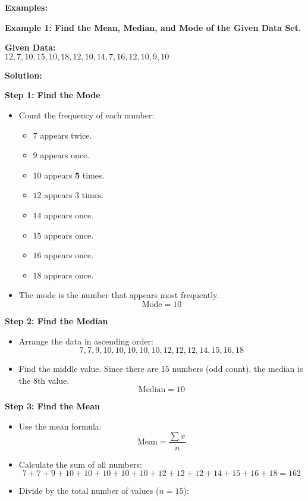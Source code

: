 \textbf{Examples:}

\begin{flushleft}
	\textbf{Example 1: Find the Mean, Median, and Mode of the Given Data Set.}
	
	\textbf{Given Data:} \\ 
	$12, 7, 10, 15, 10, 18, 12, 10, 14, 7, 16, 12, 10, 9, 10$
	
	\vspace{0.5cm}
	\textbf{Solution:}
	
	\textbf{Step 1: Find the Mode}
	\begin{itemize}
		\item Count the frequency of each number:
		\begin{itemize}
			\item $7$ appears twice.
			\item $9$ appears once.
			\item $10$ appears \textbf{5} times.
			\item $12$ appears 3 times.
			\item $14$ appears once.
			\item $15$ appears once.
			\item $16$ appears once.
			\item $18$ appears once.
		\end{itemize}
		\item The mode is the number that appears most frequently.
		\[
		\text{Mode} = 10
		\]
	\end{itemize}
\end{flushleft}

\textbf{Step 2: Find the Median}
\begin{itemize}
	\item Arrange the data in ascending order:
	\[
	7, 7, 9, 10, 10, 10, 10, 10, 12, 12, 12, 14, 15, 16, 18
	\]
	\item Find the middle value. Since there are 15 numbers (odd count), the median is the 8th value.
	\[
	\text{Median} = 10
	\]
\end{itemize}

\textbf{Step 3: Find the Mean}
\begin{itemize}
	
	\item Use the mean formula:
	\[
	\text{Mean} = \frac{\sum x}{n}
	\]
	\item Calculate the sum of all numbers:
	\[
	7 + 7 + 9 + 10 + 10 + 10 + 10 + 10 + 12 + 12 + 12 + 14 + 15 + 16 + 18 = 162
	\]
	
	\item Divide by the total number of values ($n=15$):
	
\end{itemize}


